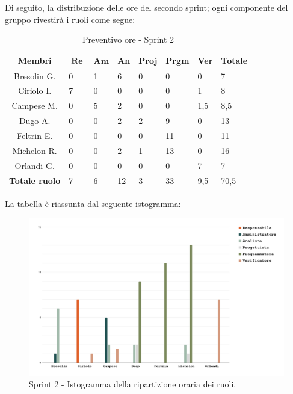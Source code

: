\documentclass[10pt, a4paper]{article}
\begin{document}
{{{{{{{{{Di seguito, la distribuzione delle ore del secondo sprint; ogni componente del gruppo rivestirà i ruoli come segue:

\begin{table}[H]
\begin{tabularx}{\textwidth}{c|X|X|X|X|X|X|X}
        \textbf{Membri} & $\operatorname{\textbf{Re}}$ & $\mathrm{\textbf{Am}}$ & \textbf{An} & \textbf{Proj} & \textbf{Prgm} & \textbf{Ver} & \textbf{Totale} \\
        \hline Bresolin G. & 0 & 1 & \cellcolor{primarycolor}6 & 0 & 0 & 0 & 7 \\
        \hline Ciriolo I.  & \cellcolor{primarycolor}7 & 0 & 0 & 0 & 0 & 1 & 8 \\
        \hline Campese M.  & 0 & \cellcolor{primarycolor}5 & 2 & 0 & 0 & 1,5 & 8,5 \\
        \hline Dugo A.     & 0 & 0 & 2 & \cellcolor{primarycolor}2 & 9 & 0 & 13 \\
        \hline Feltrin E.  & 0 & 0 & 0 & 0 & \cellcolor{primarycolor}11 & 0 & 11 \\
        \hline Michelon R. & 0 & 0 & 2 & 1 & \cellcolor{primarycolor}13 & 0 & 16 \\
        \hline Orlandi G.  & 0 & 0 & 0 & 0 & 0 & \cellcolor{primarycolor}7 & 7 \\
        \hline
        \textbf{Totale ruolo} & 7 & 6 & 12 & 3 & 33 & 9,5 & 70,5 
    \end{tabularx}
    \caption{Preventivo ore - Sprint 2}
    \end{table}

La tabella è riassunta dal seguente istogramma:
 \begin{figure}[H]
        \centering        
        \includegraphics[width=15.5cm]{istogrammi/istogramma_2_periodo.png}
        \caption{Sprint 2 - Istogramma della ripartizione oraria dei ruoli. }
    \end{figure}
 
}}}}}}}}}
\end{document}
